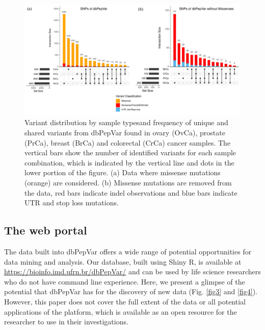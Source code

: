 \documentclass{ieeeaccess}
\begin{document}
\begin{figure}[tp]%
\centering
\includegraphics[width=1\linewidth]{fig2.png}
\caption{Variant distribution by sample typesand frequency of unique and shared variants from dbPepVar found in ovary (OvCa), prostate (PrCa), breast (BrCa) and colorectal (CrCa) cancer samples. The vertical bars show the number of identified variants for each sample combination, which is indicated by the vertical line and dots in the lower portion of the figure. (a) Data where missense mutations (orange) are considered. (b) Missense mutations are removed from the data, red bars indicate indel observations and blue bars indicate UTR and stop loss mutations. \label{fig2}}
\end{figure}


\subsection{The web portal}

The data built into dbPepVar offers a wide range of potential opportunities for data mining and analysis. Our database, built using Shiny R, is available at \url{https://bioinfo.imd.ufrn.br/dbPepVar/}  and can be used by life science researchers who do not have command line experience. Here, we present a glimpse of the potential that dbPepVar has for the discovery of new data (Fig. \ref{fig3} and \ref{fig4}). However, this paper does not cover the full extent of the data or all potential applications of the platform, which is available as an open resource for the researcher to use in their investigations.
\end{document}
